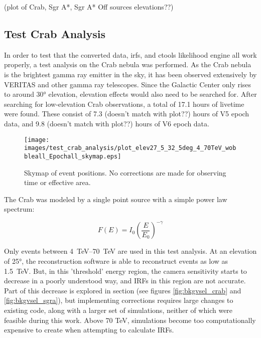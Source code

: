   {\color{red}(plot of Crab, Sgr A*, Sgr A* Off sources elevations??)}

  \subsection{Test Crab Analysis}\label{subsec:crab_analysis}

    In order to test that the converted data, irfs, and ctools likelihood engine all work properly, a test analysis on the Crab nebula was performed.
    As the Crab nebula is the brightest gamma ray emitter in the sky, it has been observed extensively by VERITAS and other gamma ray telescopes.
    Since the Galactic Center only rises to around \ang{30} elevation, elevation effects would also need to be searched for.
    After searching for low-elevation Crab observations, a total of 17.1 hours of livetime were found.
    These consist of 7.3 {\color{red}(doesn't match with plot??)} hours of V5 epoch data, and 9.8 {\color{red}(doesn't match with plot??)} hours of V6 epoch data.
    
    \begin{figure}[h]
      \centering
      \texttt{[image: images/test\_crab\_analysis/plot\_elev27\_5\_32\_5deg\_4\_70TeV\_wobbleall\_Epochall\_skymap.eps]}
      \caption[Crab Counts Skymap]
      {
        Skymap of event positions.
        No corrections are made for observing time or effective area.
      }
      \label{fig:crab_skymap}
    \end{figure}
    
    The Crab was modeled by a single point source with a simple power law spectrum:

    \begin{equation} \label{eqn:powerlaw}
    F\left( E \right) = I_{0} \left( \frac{E}{E_{0}} \right)^{-\gamma}
    \end{equation}

    Only events between \SIrange{4}{70}{TeV} are used in this test analysis.
    At an elevation of \ang{25}, the reconstruction software is able to reconstruct events as low as \SI{1.5}{TeV}.
    But, in this 'threshold' energy region, the camera sensitivity starts to decrease in a poorly understood way, and IRFs in this region are not accurate.
    Part of this decrease is explored in section (see figures \ref{fig:bkgvsel_crab} and \ref{fig:bkgvsel_sgra}), but implementing corrections requires large changes to existing code, along with a larger set of simulations, neither of which were feasible during this work.
    Above 70 TeV, simulations become too computationally expensive to create when attempting to calculate IRFs.
    
